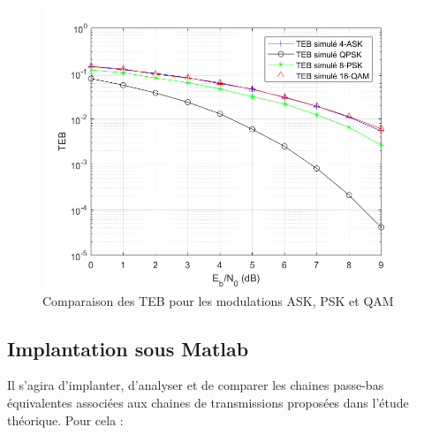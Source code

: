 \documentclass[frenchb]{article}
\begin{document}
 \begin{figure}[ht!]
    \centering
    \includegraphics[width=12cm]{Comp_TEB.png}
    \caption{Comparaison des TEB pour les modulations ASK, PSK et QAM}
    \label{comp_TEB}
 \end{figure}

\subsection{Implantation sous Matlab}
Il s'agira d'implanter, d'analyser et de comparer les chaines passe-bas équivalentes associées aux chaines de transmissions proposées dans l'étude théorique.
Pour cela :
\end{document}
